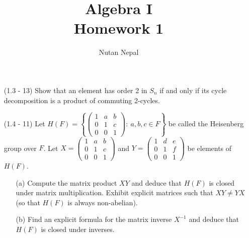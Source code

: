 \documentclass[12pt]{article}
\title{\textbf{Algebra I}\\
\large Homework 1
}
\author{Nutan Nepal}
\begin{document}
\maketitle
\makebox[\linewidth]{\rule{200mm}{1pt}}
\vspace{.1in}
\begin{enumerate}

\item[(1.3 - 13)] Show that an element has order 2 in 
    $S_n$ if and only if its cycle decomposition is a
    product of commuting 2-cycles.

\begin{mybox}

\end{mybox}


\item[(1.4 - 11)] Let $H(F)=\left\{\left(\begin{array}{ccc}
    1 & a & b\\
    0 & 1 & c\\
    0 & 0 & 1 \end{array}
    \right):\ a,b,c\in F\right\}$ be called the Heisenberg
    group over $F$. Let $X=\left(\begin{array}{ccc}
        1 & a & b\\
        0 & 1 & c\\
        0 & 0 & 1 \end{array}
        \right)$
    and $Y=\left(\begin{array}{ccc}
        1 & d & e\\
        0 & 1 & f\\
        0 & 0 & 1 \end{array}
        \right)$ be elements of $H(F)$.
    \begin{enumerate}

        \item[(a)] Compute the matrix product $XY$ and
        deduce that $H(F)$ is closed under matrix
        multiplication. Exhibit explicit matrices such that
        $XY\neq YX$ (so that $H(F)$ is always non-abelian).
        \begin{mybox}
            

        \end{mybox}

        \item[(b)] Find an explicit formula for the matrix
        inverse $X^{-1}$ and deduce that $H(F)$ is closed
        under inverses.
        \begin{mybox}
            

\end{mybox}
\end{enumerate}
\end{enumerate}
\end{document}
